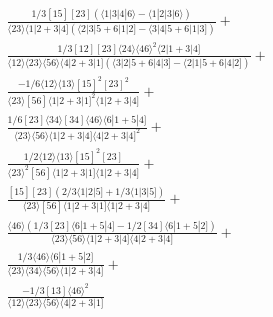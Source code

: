\documentclass[varwidth, border=5pt]{standalone}
\begin{document}
\begin{my}
$\begin{gathered}
\scriptscriptstyle\frac{1/3[15][23](⟨1|3|4|6⟩-⟨1|2|3|6⟩)}{⟨23⟩⟨1|2+3|4](⟨2|3|5+6|1|2]-⟨3|4|5+6|1|3])}+\\
\scriptscriptstyle\frac{1/3[12][23]⟨24⟩⟨46⟩^2⟨2|1+3|4]}{⟨12⟩⟨23⟩⟨56⟩⟨4|2+3|1](⟨3|2|5+6|4|3]-⟨2|1|5+6|4|2])}+\\
\scriptscriptstyle\frac{-1/6⟨12⟩⟨13⟩[15]^2[23]^2}{⟨23⟩[56]⟨1|2+3|1]^2⟨1|2+3|4]}+\\
\scriptscriptstyle\frac{1/6[23]⟨34⟩[34]⟨46⟩⟨6|1+5|4]}{⟨23⟩⟨56⟩⟨1|2+3|4]⟨4|2+3|4]^2}+\\
\scriptscriptstyle\frac{1/2⟨12⟩⟨13⟩[15]^2[23]}{⟨23⟩^2[56]⟨1|2+3|1]⟨1|2+3|4]}+\\
\scriptscriptstyle\frac{[15][23](2/3⟨1|2|5]+1/3⟨1|3|5])}{⟨23⟩[56]⟨1|2+3|1]⟨1|2+3|4]}+\\
\scriptscriptstyle\frac{⟨46⟩(1/3[23]⟨6|1+5|4]-1/2[34]⟨6|1+5|2])}{⟨23⟩⟨56⟩⟨1|2+3|4]⟨4|2+3|4]}+\\
\scriptscriptstyle\frac{1/3⟨46⟩⟨6|1+5|2]}{⟨23⟩⟨34⟩⟨56⟩⟨1|2+3|4]}+\\
\scriptscriptstyle\frac{-1/3[13]⟨46⟩^2}{⟨12⟩⟨23⟩⟨56⟩⟨4|2+3|1]}\phantom{+}
\end{gathered}$
\end{my}
\end{document}
